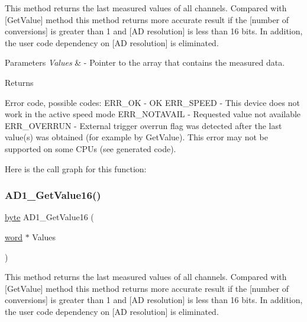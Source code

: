 This method returns the last measured values of all channels. Compared with \mbox{[}Get\+Value\mbox{]} method this method returns more accurate result if the \mbox{[}number of conversions\mbox{]} is greater than 1 and \mbox{[}AD resolution\mbox{]} is less than 16 bits. In addition, the user code dependency on \mbox{[}AD resolution\mbox{]} is eliminated. 


\begin{DoxyParams}{Parameters}
{\em Values} & -\/ Pointer to the array that contains the measured data. \\
\hline
\end{DoxyParams}
\begin{DoxyReturn}{Returns}

\begin{DoxyItemize}
\item Error code, possible codes\+: E\+R\+R\+\_\+\+OK -\/ OK E\+R\+R\+\_\+\+S\+P\+E\+ED -\/ This device does not work in the active speed mode E\+R\+R\+\_\+\+N\+O\+T\+A\+V\+A\+IL -\/ Requested value not available E\+R\+R\+\_\+\+O\+V\+E\+R\+R\+UN -\/ External trigger overrun flag was detected after the last value(s) was obtained (for example by Get\+Value). This error may not be supported on some C\+P\+Us (see generated code). 
\end{DoxyItemize}
\end{DoxyReturn}
Here is the call graph for this function\+:
\mbox{\label{group___a_d1__module_gabdd15b1c1e2b3a51eb6b1109fd0c6d75}} 
\subsubsection{\texorpdfstring{A\+D1\+\_\+\+Get\+Value16()}{AD1\_GetValue16()}}
{\footnotesize\ttfamily \hyperlink{group___p_e___types__module_ga0c8186d9b9b7880309c27230bbb5e69d}{byte} A\+D1\+\_\+\+Get\+Value16 (\begin{DoxyParamCaption}\item[{\hyperlink{group___p_e___types__module_ga285e72252c100e2508e4e933a0738f2b}{word} $\ast$}]{Values }\end{DoxyParamCaption})}



This method returns the last measured values of all channels. Compared with \mbox{[}Get\+Value\mbox{]} method this method returns more accurate result if the \mbox{[}number of conversions\mbox{]} is greater than 1 and \mbox{[}AD resolution\mbox{]} is less than 16 bits. In addition, the user code dependency on \mbox{[}AD resolution\mbox{]} is eliminated. 

